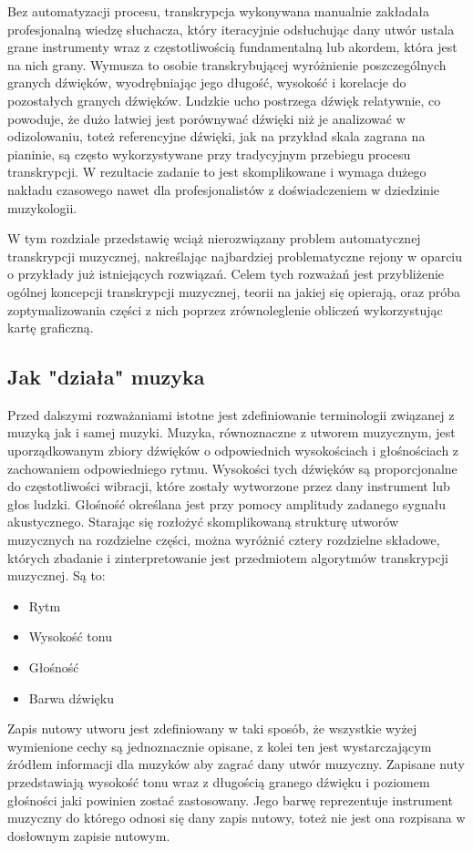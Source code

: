 \documentclass[12pt,a4paper,twoside]{mwart}
\begin{document}
Bez automatyzacji procesu, transkrypcja wykonywana manualnie zakładała profesjonalną wiedzę słuchacza, który iteracyjnie odsłuchując dany utwór ustala grane instrumenty wraz z częstotliwością fundamentalną lub akordem, która jest na nich grany. Wymusza to osobie transkrybującej wyróżnienie poszczególnych granych dźwięków, wyodrębniając jego długość, wysokość i korelacje do pozostałych granych dźwięków. Ludzkie ucho postrzega dźwięk relatywnie, co powoduje, że dużo łatwiej jest porównywać dźwięki niż je analizować w odizolowaniu, toteż referencyjne dźwięki, jak na przykład skala zagrana na pianinie, są często wykorzystywane przy tradycyjnym przebiegu procesu transkrypcji. W rezultacie zadanie to jest skomplikowane i wymaga dużego nakładu czasowego nawet dla profesjonalistów z doświadczeniem w dziedzinie muzykologii.

W tym rozdziale przedstawię wciąż nierozwiązany problem automatycznej transkrypcji muzycznej, nakreślając najbardziej problematyczne rejony w oparciu o przykłady już istniejących rozwiązań.  Celem tych rozważań jest przybliżenie ogólnej koncepcji transkrypcji muzycznej, teorii na jakiej się opierają, oraz próba zoptymalizowania części z nich poprzez zrównoleglenie obliczeń wykorzystując kartę graficzną.

\subsection{Jak "działa" muzyka}
Przed dalszymi rozważaniami istotne jest zdefiniowanie terminologii związanej z muzyką jak i samej muzyki. Muzyka, równoznaczne z utworem muzycznym, jest uporządkowanym zbiory dźwięków o odpowiednich wysokościach i głośnościach z zachowaniem odpowiedniego rytmu. Wysokości tych dźwięków są proporcjonalne do częstotliwości wibracji, które zostały wytworzone przez dany instrument lub głos ludzki. Głośność określana jest przy pomocy amplitudy zadanego sygnału akustycznego. Starając się rozłożyć skomplikowaną strukturę utworów muzycznych na rozdzielne części, można wyróżnić cztery rozdzielne składowe, których zbadanie i zinterpretowanie jest przedmiotem algorytmów transkrypcji muzycznej. Są to:
\begin{itemize}
\item Rytm
\item Wysokość tonu
\item Głośność
\item Barwa dźwięku
\end{itemize}
Zapis nutowy utworu jest zdefiniowany w taki sposób, że wszystkie wyżej wymienione cechy są jednoznacznie opisane, z kolei ten jest wystarczającym źródłem informacji dla muzyków aby zagrać dany utwór muzyczny. Zapisane nuty przedstawiają wysokość tonu wraz z długością granego dźwięku i poziomem głośności jaki powinien zostać zastosowany. Jego barwę reprezentuje instrument muzyczny do którego odnosi się dany zapis nutowy, toteż nie jest ona rozpisana w dosłownym zapisie nutowym.
\end{document}
